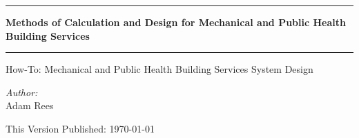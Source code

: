 \begin{titlepage}
\begin{center}
\thispagestyle{plain}
\doublespacing

\vspace*{7cm}
\hrule
\vspace{0.5cm}
{\Huge \textbf{Methods of Calculation and Design for Mechanical and Public Health Building Services}}
\vspace{0.5cm}
\hrule
\vspace{0.5cm}
\LARGE{How-To: Mechanical and Public Health Building Services System Design}
\vspace{3cm}

\begin{flushleft} 
\LARGE \emph{Author:}\\ Adam Rees
\end{flushleft}

\vfill

\small{This Version Published: \today}

\end{center}
\end{titlepage}

\onehalfspacing